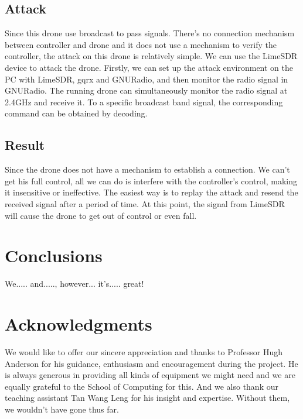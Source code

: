 \documentclass{acm_proc_article-sp}
\begin{document}
\subsection{Attack}

Since this drone use broadcast to pass signals. There's no connection mechanism between controller and drone and it does not use a mechanism to verify the controller, the attack on this drone is relatively simple. We can use the LimeSDR device to attack the drone. Firstly, we can set up the attack environment on the PC with LimeSDR, gqrx and GNURadio, and then monitor the radio signal in GNURadio. The running drone can simultaneously monitor the radio signal at 2.4GHz and receive it. To a specific broadcast band signal, the corresponding command can be obtained by decoding.

\subsection{Result}

Since the drone does not have a mechanism to establish a connection. We can't get his full control, all we can do is interfere with the controller's control, making it insensitive or ineffective. The easiest way is to replay the attack and resend the received signal after a period of time. At this point, the signal from LimeSDR will cause the drone to get out of control or even fall.



\section{Conclusions}

We..... and....., however... it's..... great!


\section{Acknowledgments}

We would like to offer our sincere appreciation and thanks to Professor Hugh Anderson for his guidance, enthusiasm and encouragement during the project. He is always generous in providing all kinds of equipment we might need and we are equally grateful to the School of Computing for this. And we also thank our teaching assistant Tan Wang Leng for his insight and expertise. Without them, we wouldn't have gone thus far.

%

%
%

\balancecolumns
\end{document}
